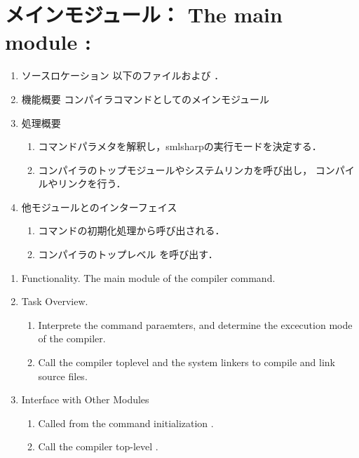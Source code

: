 \chapter{\txt
{メインモジュール：}
{The main module : }
}
\label{chap:SimpleMain}

\ifjp%
\begin{enumerate}
\item ソースロケーション
以下のファイルおよび
．

\item 機能概要
	\smlsharp{}コンパイラコマンドとしてのメインモジュール
\item 処理概要
\begin{enumerate}
\item \smlsharp{}コマンドパラメタを解釈し，smlsharp{}の実行モードを決定する．
\item \smlsharp{}コンパイラのトップモジュールやシステムリンカを呼び出し，
コンパイルやリンクを行う．
\end{enumerate}
\item 他モジュールとのインターフェイス
\begin{enumerate}
\item \smlsharp{}コマンドの初期化処理から呼び出される．
\item \smlsharp{}コンパイラのトップレベル
を呼び出す．
\end{enumerate}
\end{enumerate}
\else%
\begin{enumerate}
\item Functionality.
	The main module of the \smlsharp{} compiler command.
\item Task Overview.
\begin{enumerate}
\item Interprete the \smlsharp{} command paraemters, and  determine the
excecution mode of the \smlsharp{} compiler.
\item Call the \smlsharp{} compiler toplevel and the system linkers
to compile and link source files.
\end{enumerate}
\item Interface with Other Modules
\begin{enumerate}
\item Called from the \smlsharp{} command initialization .
\item Call the \smlsharp{} compiler top-level
.
\end{enumerate}
\end{enumerate}
\fi%

